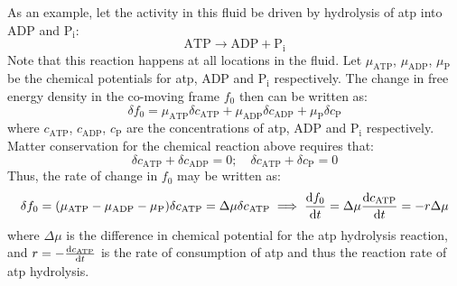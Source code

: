 As an example, let the activity in this fluid be driven by hydrolysis of \ac{atp} into ADP and $\textrm{P}_\textrm{i}$:
\begin{equation*}
    \textrm{ATP} \rightarrow \textrm{ADP} + \textrm{P}_\textrm{i}
\end{equation*}
Note that this reaction happens at all locations in the fluid. Let $\mu_{\textrm{ATP}}$, $\mu_{\textrm{ADP}}$, $\mu_{\textrm{P}}$ be the chemical potentials for \ac{atp}, ADP and $\textrm{P}_\textrm{i}$ respectively. The change in free energy density in the co-moving frame $f_0$ then can be written as:
\begin{equation}\label{eq:introSimpleActiveFluidFreeEnergyDensityRelative}
    \delta f_0 = \mu_{\textrm{ATP}}\delta c_{\textrm{ATP}} + \mu_{\textrm{ADP}}\delta c_{\textrm{ADP}} + \mu_{\textrm{P}}\delta c_{\textrm{P}}
\end{equation}
where $c_{\textrm{ATP}}$, $c_{\textrm{ADP}}$, $c_{\textrm{P}}$ are the concentrations of \ac{atp}, ADP and $\textrm{P}_\textrm{i}$ respectively. Matter conservation for the chemical reaction above requires that:
\begin{equation}
    \delta c_{\textrm{ATP}} + \delta c_{\textrm{ADP}} = 0; \quad \delta c_{\textrm{ATP}} + \delta c_{\textrm{P}} = 0
\end{equation}
Thus, the rate of change in $f_0$ may be written as:
\begin{equation}\label{eq:introSimpleActiveFluidFreeEnergyDensityRelativeRate}
    \delta f_0 = (\mu_{\textrm{ATP}} - \mu_{\textrm{ADP}} - \mu_{\textrm{P}})\delta c_{\textrm{ATP}} = \Delta\mu\delta c_{\textrm{ATP}} \implies \dv{f_0}{t} = \Delta\mu\dv{c_{\textrm{ATP}}}{t} = - r\Delta\mu
\end{equation}
where $\Delta\mu$ is the difference in chemical potential for the \ac{atp} hydrolysis reaction, and $r = -\dv{c_{\textrm{ATP}}}{t}$ is the rate of consumption of \ac{atp} and thus the reaction rate of \ac{atp} hydrolysis.

